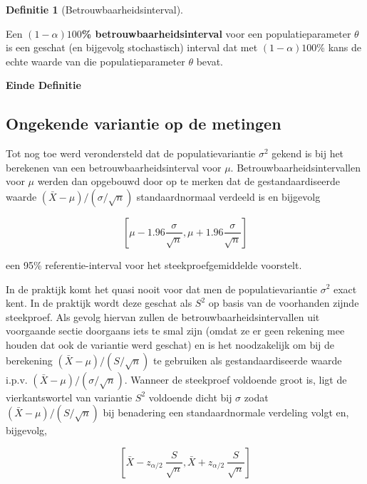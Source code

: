 \documentclass[
  12pt,dutch,coursenotes]{book}
\theoremstyle{definition}
\newtheorem{definition}{Definitie}[chapter]
\theoremstyle{definition}
\theoremstyle{definition}
\theoremstyle{definition}
\theoremstyle{remark}
\begin{document}
\begin{definition}[Betrouwbaarheidsinterval]
\protect\hypertarget{def:unnamed-chunk-149}{}{\label{def:unnamed-chunk-149} {} }
\end{definition}
Een \textbf{\((1-\alpha)100\)\% betrouwbaarheidsinterval} voor een populatieparameter \(\theta\) is een
geschat (en bijgevolg stochastisch) interval dat met \((1-\alpha)100\)\% kans
de echte waarde van die populatieparameter \(\theta\) bevat.

\textbf{Einde Definitie}

\hypertarget{sec:tBI}{%
\subsection{Ongekende variantie op de metingen}\label{sec:tBI}}

Tot nog toe werd verondersteld dat de populatievariantie \(\sigma^2\) gekend is bij het berekenen van een betrouwbaarheidsinterval voor \(\mu\).
Betrouwbaarheidsintervallen voor \(\mu\) werden dan opgebouwd door op te
merken dat de gestandaardiseerde waarde \((\bar{X} - \mu)/(\sigma/\sqrt{n})\)
standaardnormaal verdeeld is en bijgevolg

\begin{equation*}
\left[\mu - 1.96 \frac{\sigma}{\sqrt{n}},\mu + 1.96 \frac{\sigma}{\sqrt{n}}%
\right]
\end{equation*}

een 95\% referentie-interval voor het steekproefgemiddelde voorstelt.

In de praktijk komt het quasi nooit voor dat men de populatievariantie \(\sigma^2\) exact kent. In de praktijk wordt deze geschat als \(S^2\) op basis van de voorhanden zijnde steekproef. Als gevolg hiervan zullen de betrouwbaarheidsintervallen uit voorgaande sectie doorgaans iets te smal zijn (omdat ze er geen rekening mee houden dat ook de variantie werd geschat) en is het
noodzakelijk om bij de berekening \((\bar{X} - \mu)/(S/\sqrt{n})\) te
gebruiken als gestandaardiseerde waarde i.p.v. \((\bar{X} - \mu)/(\sigma/\sqrt{n})\). Wanneer de steekproef voldoende groot is, ligt de vierkantswortel van variantie \(S^2\) voldoende dicht bij \(\sigma\) zodat \({(\bar{X} - \mu)}/{(S/\sqrt{n}) }\) bij benadering een standaardnormale verdeling volgt en, bijgevolg,

\begin{equation*}
\left[\bar{X} - z_{\alpha/2} \ \frac{S}{\sqrt{n}} , \bar{X} + z_{\alpha/2} \
\frac{S}{\sqrt{n}}\right]
\end{equation*}
\end{document}
